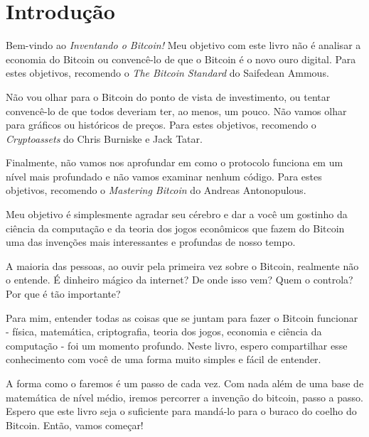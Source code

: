 \chapter*{Introdução}
\label{ch:introducao}

Bem-vindo ao \textit{Inventando o Bitcoin!} Meu objetivo com este livro não é analisar a economia do Bitcoin ou convencê-lo de que o Bitcoin é o novo ouro digital. Para estes objetivos, recomendo o \textit{The Bitcoin Standard} do Saifedean Ammous.

Não vou olhar para o Bitcoin do ponto de vista de investimento, ou tentar convencê-lo de que todos deveriam ter, ao menos, um pouco. Não vamos olhar para gráficos ou históricos de preços. Para estes objetivos, recomendo o \textit{Cryptoassets} do Chris Burniske e Jack Tatar.

Finalmente, não vamos nos aprofundar em como o protocolo funciona em um nível mais profundado e não vamos examinar nenhum código. Para estes objetivos, recomendo o \textit{Mastering Bitcoin} do Andreas Antonopulous.

Meu objetivo é simplesmente agradar seu cérebro e dar a você um gostinho da ciência da computação e da teoria dos jogos econômicos que fazem do Bitcoin uma das invenções mais interessantes e profundas de nosso tempo.

A maioria das pessoas, ao ouvir pela primeira vez sobre o Bitcoin, realmente não o entende. É dinheiro mágico da internet? De onde isso vem? Quem o controla? Por que é tão importante?

Para mim, entender todas as coisas que se juntam para fazer o Bitcoin funcionar - física, matemática, criptografia, teoria dos jogos, economia e ciência da computação - foi um momento profundo. Neste livro, espero compartilhar esse conhecimento com você de uma forma muito simples e fácil de entender.

A forma como o faremos é um passo de cada vez. Com nada além de uma base de matemática de nível médio, iremos percorrer a invenção do bitcoin, passo a passo. Espero que este livro seja o suficiente para mandá-lo para o buraco do coelho do Bitcoin. Então, vamos começar!